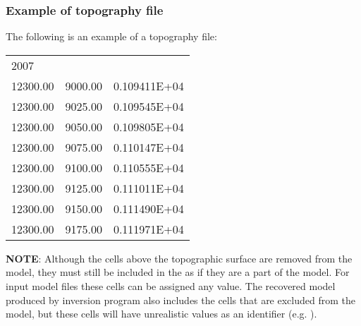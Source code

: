 \subsubsection*{Example of topography file}
The following is an example of a topography file:
\begin{fileExample}
\begin{tabular}{|lcc|}
\hline
2007 & & \\
12300.00 & 9000.00 & 0.109411E+04 \\
12300.00 & 9025.00 & 0.109545E+04 \\
12300.00 & 9050.00 & 0.109805E+04 \\
12300.00 & 9075.00 & 0.110147E+04 \\
12300.00 & 9100.00 & 0.110555E+04 \\
12300.00 & 9125.00 & 0.111011E+04 \\
12300.00 & 9150.00 & 0.111490E+04 \\
12300.00 & 9175.00 & 0.111971E+04 \\
\hline
\end{tabular}
\end{fileExample}
%
\textbf{NOTE}: Although the cells above the topographic surface are removed from the model, they must still be included in the  as if they are a part of the model. For input model files these cells can be assigned any value. The recovered model produced by inversion program also includes the cells that are excluded from the model, but these cells will have unrealistic values as an identifier (e.g. ).